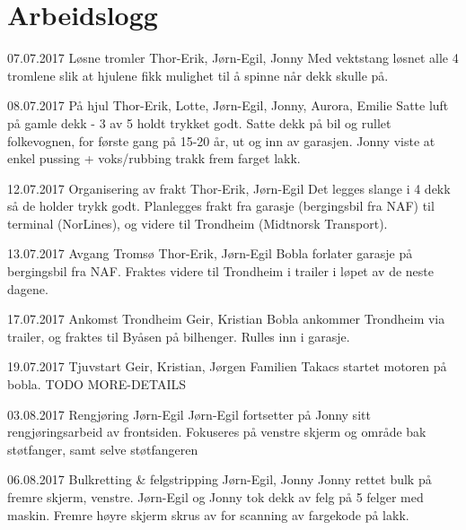 \chapter{Arbeidslogg}

\worklogitem
	{07.07.2017}
	{L\o sne tromler}
	{Thor-Erik, J\o rn-Egil, Jonny}
	{Med vektstang l\o snet alle 4 tromlene slik at hjulene fikk mulighet til å spinne når dekk skulle på.}


\worklogitem
	{08.07.2017}
	{På hjul}
	{Thor-Erik, Lotte, J\o rn-Egil, Jonny, Aurora, Emilie}
	{Satte luft på gamle dekk - 3 av 5 holdt trykket godt. Satte dekk på bil og rullet folkevognen, for f\o rste gang på 15-20 år, ut og inn av garasjen. Jonny viste at enkel pussing + voks/rubbing trakk frem farget lakk.}


\worklogitem
	{12.07.2017}
	{Organisering av frakt}
	{Thor-Erik, J\o rn-Egil}
	{Det legges slange i 4 dekk så de holder trykk godt. Planlegges frakt fra garasje (bergingsbil fra NAF) til terminal (NorLines), og videre til Trondheim (Midtnorsk Transport).}


\worklogitem
	{13.07.2017}
	{Avgang Troms\o }
	{Thor-Erik, J\o rn-Egil}
	{Bobla forlater garasje på bergingsbil fra NAF. Fraktes videre til Trondheim i trailer i l\o pet av de neste dagene.}


\worklogitem
	{17.07.2017}
	{Ankomst Trondheim}
	{Geir, Kristian}
	{Bobla ankommer Trondheim via trailer, og fraktes til Byåsen på bilhenger. Rulles inn i garasje.}


\worklogitem
	{19.07.2017}
	{Tjuvstart}
	{Geir, Kristian, J\o rgen}
	{Familien Takacs startet motoren på bobla. TODO MORE-DETAILS}


\worklogitem
	{03.08.2017}
	{Rengj\o ring}
	{J\o rn-Egil}
	{J\o rn-Egil fortsetter på Jonny sitt rengj\o ringsarbeid av frontsiden. Fokuseres på venstre skjerm og område bak st\o tfanger, samt selve st\o tfangeren}


\worklogitem
	{06.08.2017}
	{Bulkretting \& felgstripping}
	{J\o rn-Egil, Jonny}
	{Jonny rettet bulk på fremre skjerm, venstre. J\o rn-Egil og Jonny tok dekk av felg på 5 felger med maskin. Fremre h\o yre skjerm skrus av for scanning av fargekode på lakk.}


